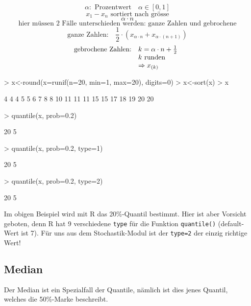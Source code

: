 \[ \alpha: \text{ Prozentwert} \quad \alpha \in [0,1] \]
\[ x_1 - x_n \text{ sortiert nach grösse}  \]
\[ \alpha \cdot n \]
\[ \text{hier müssen 2 Fälle unterschieden werden: ganze Zahlen und gebrochene} \]
\[ \text{ganze Zahlen:} \quad \frac{1}{2} 
\cdot (x_{\alpha \cdot n} + x_{\alpha \cdot (n+1)}) \]
\[ \begin{array}{@{}@{}ll}
	\text{gebrochene Zahlen:} & k=\alpha \cdot n + \frac{1}{2} \\
	                          & k \text{ runden} \\
				  & \Rightarrow x_{(k)}
\end{array}\]

\begin{Schunk}
\begin{Sinput}
> x<-round(x=runif(n=20, min=1, max=20), digits=0)
> x<-sort(x)
> x
\end{Sinput}
\begin{Soutput}
 [1]  4  4  4  5  5  6  7  8  8 10 11 11 11 15 15 17 18 19 20 20
\end{Soutput}
\begin{Sinput}
> quantile(x, prob=0.2)
\end{Sinput}
\begin{Soutput}
20%
  5 
\end{Soutput}
\begin{Sinput}
> quantile(x, prob=0.2, type=1)
\end{Sinput}
\begin{Soutput}
20%
  5 
\end{Soutput}
\begin{Sinput}
> quantile(x, prob=0.2, type=2)
\end{Sinput}
\begin{Soutput}
20%
  5 
\end{Soutput}
\end{Schunk}
Im obigen Beispiel wird mit R das 20\%-Quantil bestimmt. Hier ist aber 
Vorsicht geboten, denn R hat 9 verschiedene \verb!type! für die Funktion
\verb!quantile()! (default-Wert ist 7). Für uns aus dem 
Stochastik-Modul ist der \verb!type=2! 
der einzig richtige Wert!

\subsection{Median}
Der Median ist ein Spezialfall der Quantile, nämlich ist dies jenes Quantil,
welches die 50\%-Marke beschreibt.

